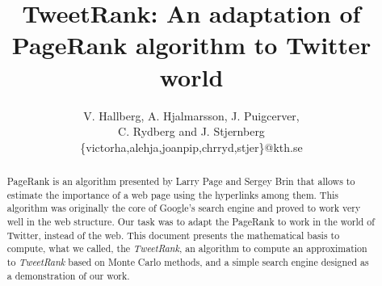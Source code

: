 \documentclass[11pt,a4paper]{article}
\author{V. Hallberg, A. Hjalmarsson, J. Puigcerver, \\C. Rydberg and J. Stjernberg\\
\footnotesize{\{victorha,alehja,joanpip,chrryd,stjer\}@kth.se}}
\title{TweetRank: An adaptation of PageRank algorithm to Twitter world}
\begin{document}
\maketitle
\begin{abstract}
\noindent
PageRank is an algorithm presented by Larry Page and Sergey Brin that allows to estimate the importance of a web page using the hyperlinks among them. This algorithm was originally the core of Google's search engine and proved to work very well in the web structure. Our task was to adapt the PageRank to work in the world of Twitter, instead of the web. This document presents the mathematical basis to compute, what we called, the \emph{TweetRank}, an algorithm to compute an approximation to \emph{TweetRank} based on Monte Carlo methods, and a simple search engine designed as a demonstration of our work.
\end{abstract}

\newpage

\tableofcontents  

\newpage








\newpage



\end{document}
